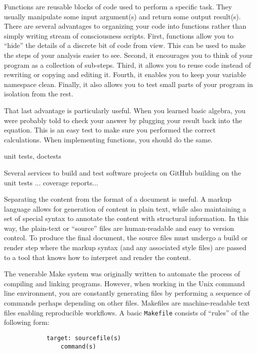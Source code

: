 Functions are reusable blocks of code used to perform a specific task.
They usually manipulate some input argument(s) and return some output
result(s).
There are several advantages to organizing your code into functions rather
than simply writing stream of consciousness scripts.
First, functions allow you to ``hide'' the details of a discrete bit of
code from view.
This can be used to make the steps of your analysis easier to see.
Second, it encourages you to think of your program as a collection of sub-steps.
Third, it allows you to reuse code instead of rewriting or copying and editing
it.
Fourth, it enables you to keep your variable namespace clean.
Finally, it also allows you to test small parts of your program in isolation
from the rest.

That last advantage is particularly useful.
When you learned basic algebra, you were probably told to check your answer by
plugging your result back into the equation.
This is an easy test to make sure you performed the correct calculations. 
When implementing functions, you should do the same.

unit tests, doctests


Several services to build and test software projects on GitHub 
building on the unit tests ...
coverage reports...

Separating the content from the format of a document is useful.
A markup language allows for generation of content in plain text, while also
maintaining a set of special syntax to annotate the content with structural
information.
In this way, the plain-text or ``source'' files are human-readable and easy to
version control.
To produce the final document, the source files must undergo a build or render
step where the markup syntax (and any associated style files) are passed to a
tool that knows how to interpret and render the content.


The venerable Make system was originally written to automate the process
of compiling and linking programs.
However, when working in the Unix command line environment, you are constantly
generating files by performing a sequence of commands perhaps depending on
other files.
Makefiles are machine-readable text files enabling reproducible workflows.
A basic \texttt{Makefile} consists of ``rules'' of the following form:
\begin{verbatim}
            target: sourcefile(s)
                command(s)
\end{verbatim}


